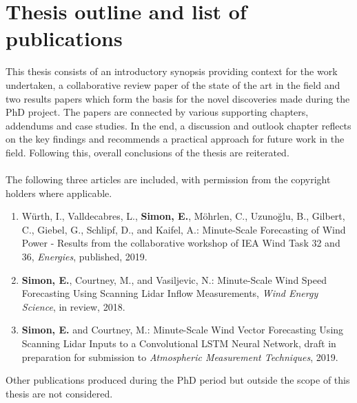 \chapter{Thesis outline and list of publications}
\label{sec:outline}


This thesis consists of an introductory synopsis providing context for the work undertaken, a collaborative review paper of the state of the art in the field and two results papers which form the basis for the novel discoveries made during the PhD project. The papers are connected by various supporting chapters, addendums and case studies. In the end, a discussion and outlook chapter reflects on the key findings and recommends a practical approach for future work in the field. Following this, overall conclusions of the thesis are reiterated.
\\\\
The following three articles are included, with permission from the copyright holders where applicable.
\\
\begin{enumerate}
    \item W\"urth, I., Valldecabres, L., \textbf{Simon, E.}, M\"ohrlen, C., Uzuno\u glu, B., Gilbert, C., Giebel, G., Schlipf, D., and Kaifel, A.: Minute-Scale Forecasting of Wind Power - Results from the collaborative workshop of IEA Wind Task 32 and 36, \textit{Energies}, published, 2019.
    
    \item \textbf{Simon, E.}, Courtney, M., and Vasiljevic, N.: Minute-Scale Wind Speed Forecasting Using Scanning Lidar Inflow Measurements, \textit{Wind Energy Science}, in review, 2018.
    
    \item \textbf{Simon, E.} and Courtney, M.: Minute-Scale Wind Vector Forecasting Using Scanning Lidar Inputs to a Convolutional LSTM Neural Network, draft in preparation for submission to \textit{Atmospheric Measurement Techniques}, 2019.

\end{enumerate}

\noindent
Other publications produced during the PhD period but outside the scope of this thesis are not considered.